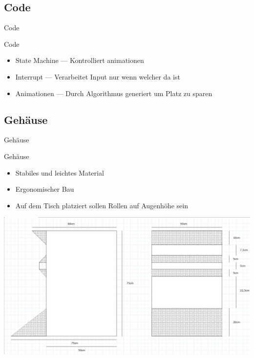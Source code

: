 \documentclass[mathserif,9pt]{beamer}
\begin{document}
    \subsection{Code}
    \begin{frame}{Code}
        \begin{block}{Code}
            \begin{itemize}
                \item State Machine --- Kontrolliert animationen
                \item Interrupt --- Verarbeitet Input nur wenn welcher da ist
                \item Animationen --- Durch Algorithmus generiert um Platz zu sparen
            \end{itemize}
        \end{block}
    \end{frame}

    \subsection{Gehäuse}
    \begin{frame}{Gehäuse}
        \begin{block}{Gehäuse}
            \begin{itemize}
                \item Stabiles und leichtes Material
                \item Ergonomischer Bau
                \item Auf dem Tisch platziert sollen Rollen auf Augenhöhe sein
            \end{itemize}
            \includegraphics[height=0.4\paperheight]{img/gehause.png}
        \end{block}
    \end{frame}
\end{document}
